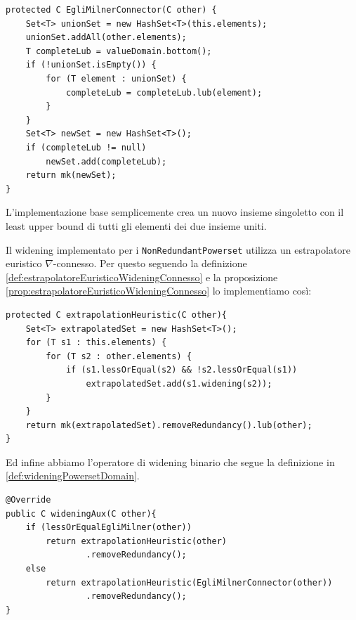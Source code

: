 \begin{lstlisting}[belowskip=-1.1 \baselineskip]
protected C EgliMilnerConnector(C other) {
    Set<T> unionSet = new HashSet<T>(this.elements);
    unionSet.addAll(other.elements);
    T completeLub = valueDomain.bottom();
    if (!unionSet.isEmpty()) {
        for (T element : unionSet) {
            completeLub = completeLub.lub(element);
        }
    }
    Set<T> newSet = new HashSet<T>();
    if (completeLub != null)
        newSet.add(completeLub);
    return mk(newSet);
}
\end{lstlisting}
L'implementazione base semplicemente crea un nuovo insieme singoletto con il least upper bound di tutti gli elementi dei due insieme uniti. 

\noindent Il widening implementato per i \texttt{NonRedundantPowerset} utilizza un estrapolatore euristico \(\nabla\)-connesso. Per questo seguendo la definizione \ref{def:estrapolatoreEuristicoWideningConnesso} e la proposizione \ref{prop:estrapolatoreEuristicoWideningConnesso} lo implementiamo così: 
\begin{lstlisting}[belowskip=-1.1 \baselineskip]
protected C extrapolationHeuristic(C other){
    Set<T> extrapolatedSet = new HashSet<T>();
    for (T s1 : this.elements) {
        for (T s2 : other.elements) {
            if (s1.lessOrEqual(s2) && !s2.lessOrEqual(s1))
                extrapolatedSet.add(s1.widening(s2));
        }
    }
    return mk(extrapolatedSet).removeRedundancy().lub(other);
}
\end{lstlisting}
Ed infine abbiamo l'operatore di widening binario che segue la definizione in \ref{def:wideningPowersetDomain}. 
\begin{lstlisting}[belowskip=-1.1 \baselineskip]
@Override
public C wideningAux(C other){
    if (lessOrEqualEgliMilner(other))
        return extrapolationHeuristic(other)
                .removeRedundancy();
    else
        return extrapolationHeuristic(EgliMilnerConnector(other))
                .removeRedundancy();
}
\end{lstlisting}

